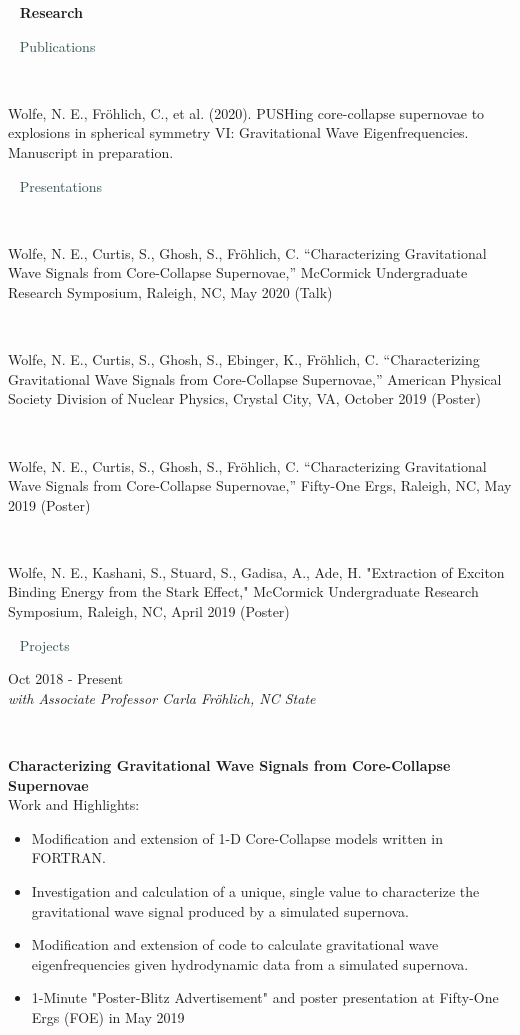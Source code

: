 \documentclass[8pt]{article}
\def \primarycolor   {spacecadet}
\def \secondarycolor {darkslategray}
\def \tertiarycolor  {airforceblue} %
\def \titlerectmin{0.15cm}
\def \titlerectmax{0.35cm}
\def \leftcolwidth{3.05cm}
\newcommand{\cvheader}[1]{
    \tikz{\fill [\primarycolor] (0,\titlerectmin) rectangle (\leftcolwidth,\titlerectmax);} \ 
    \textcolor{\primarycolor}{ \large{\textbf{#1}} } 
}
\newcommand{\cvsubtitle}[1]{
    \hspace{\leftcolwidth} \ \textcolor{\secondarycolor}{ \large{{#1}} }
}
\newcommand{\cventry}[4]{
    \begin{minipage}[t]{\leftcolwidth} 
        \small{
            \begin{flushright}
                #2\\
                \textcolor{\tertiarycolor}{\textit{#4}}
            \end{flushright}
        }
    \end{minipage} \ \
    \begin{minipage}[t]{\linewidth-\leftcolwidth} \normalsize{\textbf{#1} \\ #3} \end{minipage}
} %
\newcommand{\cventrysingle}[3]{
    \begin{minipage}[t]{\leftcolwidth} \small{#2 \begin{flushleft}\textcolor{\tertiarycolor}{\textit{#3}} \end{flushleft} } 
    \end{minipage} \ \
    \begin{minipage}[t]{\linewidth-\leftcolwidth} \normalsize{{#1}} \end{minipage}
}
\begin{document}
\cvheader{Research}

\cvsubtitle{Publications}

\cventrysingle{Wolfe, N. E., Fr\"ohlich, C., et al. (2020). PUSHing core-collapse supernovae to explosions in spherical symmetry VI: Gravitational Wave Eigenfrequencies. Manuscript in preparation.}{}{}

\cvsubtitle{Presentations}

\cventrysingle{Wolfe, N. E., Curtis, S., Ghosh, S., Fr\"ohlich, C. “Characterizing Gravitational Wave Signals from Core-Collapse Supernovae,” McCormick Undergraduate Research Symposium, Raleigh, NC, May 2020 (Talk)}{}{}

\cventrysingle{Wolfe, N. E., Curtis, S., Ghosh, S., Ebinger, K., Fr\"ohlich, C. “Characterizing Gravitational Wave Signals from Core-Collapse Supernovae,” American Physical Society Division of Nuclear Physics, Crystal City, VA, October 2019 (Poster)}{}{}

\cventrysingle{Wolfe, N. E., Curtis, S., Ghosh, S., Fr\"ohlich, C. “Characterizing Gravitational Wave Signals from Core-Collapse Supernovae,” Fifty-One Ergs, Raleigh, NC, May 2019 (Poster)}{}{}

\cventrysingle{Wolfe, N. E., Kashani, S., Stuard, S., Gadisa, A., Ade, H. "Extraction of Exciton Binding Energy from the Stark Effect," McCormick Undergraduate Research Symposium, Raleigh, NC, April 2019 (Poster)}{}{}

\cvsubtitle{Projects}

\cventry{Characterizing Gravitational Wave Signals from Core-Collapse Supernovae}{Oct 2018 - Present}
{Work and Highlights:
    \begin{itemize}
        \item{Modification and extension of 1-D Core-Collapse models written in FORTRAN.}
        \item{Investigation and calculation of a unique, single value to characterize the gravitational wave signal produced by a simulated supernova.}
        \item{Modification and extension of code to calculate gravitational wave eigenfrequencies given hydrodynamic data from a simulated supernova.}%
        \item{1-Minute "Poster-Blitz Advertisement" and poster presentation at Fifty-One Ergs (FOE) in May 2019}
    \end{itemize}
}{with Associate Professor Carla Fr\"ohlich, NC State}
\end{document}
